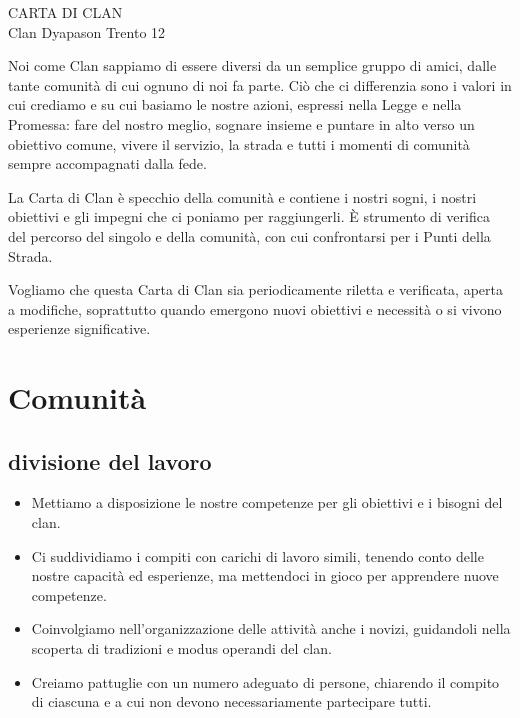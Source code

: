 \documentclass[12pt]{report}
\newcommand\BackgroundPic{%
\put(0,-50){
\parbox[b][\paperheight]{\paperwidth}{%
\vfill
\centering
\texttt{[image: cover.png]}%
\vfill
}}}
\begin{document}
	\AddToShipoutPicture*{\BackgroundPic}
	
	\begin{titlepage}
		\centering
		\vfill
		\Huge
		CARTA DI CLAN\\
		\vskip1cm
		\large Clan Dyapason Trento 12
		
		\vfill
	\end{titlepage}
	
	
	Noi come Clan sappiamo di essere diversi da un semplice gruppo di amici, 
	dalle tante comunità di cui ognuno di noi fa parte. Ciò che ci differenzia 
	sono i valori in cui crediamo e su cui basiamo le nostre azioni, espressi 
	nella Legge e nella Promessa: fare del nostro meglio, sognare insieme e 
	puntare in alto verso un obiettivo comune, vivere il servizio, la strada e 
	tutti i momenti di comunità sempre accompagnati dalla fede. 

	La Carta di Clan è specchio della comunità e contiene i nostri sogni, i 
	nostri obiettivi e gli impegni che ci poniamo per raggiungerli. È strumento 
	di verifica del percorso del singolo e della comunità, con cui confrontarsi 
	per i Punti della Strada. 

	Vogliamo che questa Carta di Clan sia periodicamente riletta e verificata, 
	aperta a modifiche, soprattutto quando emergono nuovi obiettivi e necessità 
	o si vivono esperienze significative.

	
	\chapter*{Comunità}
	
		\section*{divisione del lavoro}
		\begin{itemize}
			\item Mettiamo a disposizione le nostre competenze per gli 
			obiettivi e i bisogni del clan.
			\item Ci suddividiamo i compiti con carichi di lavoro simili, 
			tenendo conto delle nostre capacità ed esperienze, ma 
			mettendoci in gioco per apprendere nuove competenze.
			\item Coinvolgiamo nell'organizzazione delle attività 
			anche i novizi, guidandoli nella scoperta di tradizioni 
			e modus operandi del clan.
			\item Creiamo pattuglie con un numero adeguato di persone, 
			chiarendo il compito di ciascuna e a cui non devono
			necessariamente partecipare tutti.
		\end{itemize}
		
\end{document}
